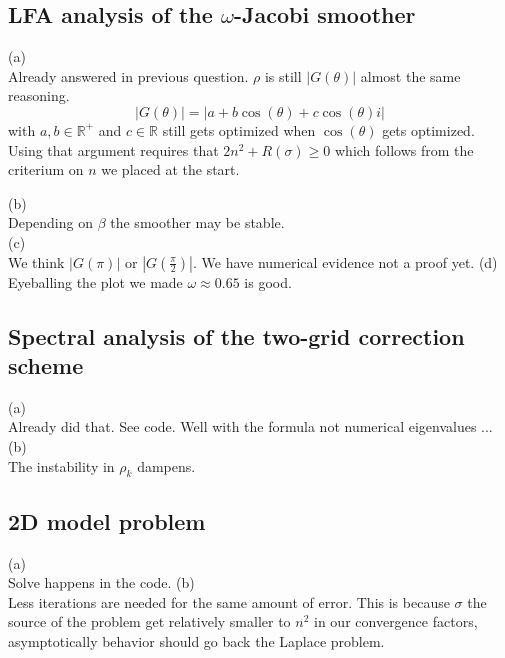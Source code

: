 \documentclass[a4paper,12pt]{article}
\begin{document}
\subsection{LFA analysis of the $\omega$-Jacobi smoother}
(a) \\
Already answered in previous question. $\rho$ is still $|G(\theta)|$ almost the same reasoning.
\begin{equation}
    |G(\theta)| = |a + b \cos(\theta) + c \cos(\theta)i|
\end{equation}
with $a,b \in \mathbb{R}^{+}$ and $c \in  \mathbb{R}$ still gets optimized when $\cos\left(\theta\right)$
gets optimized. Using that argument requires that $2n^{2}+R(\sigma)\geq 0$ which follows from the criterium on
$n$ we placed at the start.

(b) \\
Depending on $\beta$ the smoother may be stable. \\
(c) \\
We think $|G(\pi)|$ or $|G(\frac{\pi}{2})|$. We have numerical evidence not a proof yet.
(d) \\
Eyeballing the plot we made $\omega \approx 0.65$ is good.

\subsection{Spectral analysis of the two-grid correction scheme}
(a) \\
Already did that. See code. Well with the formula not numerical eigenvalues ... \\
(b) \\
The instability in $\rho_{k}$ dampens.


\subsection{2D model problem}
(a) \\
Solve happens in the code.
(b) \\
Less iterations are needed for the same amount of error. This is because
$\sigma$ the source of the problem get relatively smaller to $n^{2}$ in
our convergence factors, asymptotically behavior should go back the
Laplace problem.
\end{document}
